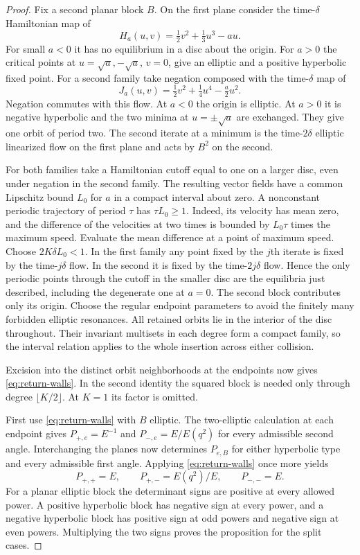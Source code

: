 \begin{proof}
Fix a second planar block $B$. On the first plane consider the
time-$\delta$ Hamiltonian map of
\[
 H_a(u,v)=\tfrac12v^2+\tfrac13u^3-au .
\]
For small $a<0$ it has no equilibrium in a disc about the origin.
For $a>0$ the critical points at $u=\sqrt a,-\sqrt a$, $v=0$,
give an elliptic and a positive hyperbolic fixed point. For a
second family take negation composed with the time-$\delta$ map of
\[
 J_a(u,v)=\tfrac12v^2+\tfrac14u^4-\tfrac a2u^2 .
\]
Negation commutes with this flow. At $a<0$ the origin is elliptic.
At $a>0$ it is negative hyperbolic and the two minima at
$u=\pm\sqrt a$ are exchanged. They give one orbit of period two.
The second iterate at a minimum is the time-$2\delta$ elliptic
linearized flow on the first plane and acts by $B^2$ on the second.

For both families take a Hamiltonian cutoff equal to one on a
larger disc, even under negation in the second family. The resulting
vector fields have a common Lipschitz bound $L_0$ for $a$ in a
compact interval about zero. A nonconstant periodic trajectory of
period $\tau$ has $\tau L_0\ge1$. Indeed, its velocity has mean
zero, and the difference of the velocities at two times is bounded
by $L_0\tau$ times the maximum speed. Evaluate the mean difference
at a point of maximum speed. Choose $2K\delta L_0<1$. In the first
family any point fixed by the $j$th iterate is fixed by the
time-$j\delta$ flow. In the second it is fixed by the time-$2j\delta$
flow. Hence the only periodic points through the cutoff in the
smaller disc are the equilibria just described, including the
degenerate one at $a=0$. The second block contributes only its
origin. Choose the regular endpoint parameters to avoid the finitely
many forbidden elliptic resonances. All retained orbits lie in the
interior of the disc throughout. Their invariant multisets in each
degree form a compact family, so the interval relation applies to
the whole insertion across either collision.

Excision into the distinct orbit neighborhoods at the endpoints now gives
\eqref{eq:return-walls}. In the second identity the squared block is
needed only through degree $\lfloor K/2\rfloor$. At $K=1$ its factor
is omitted.

First use \eqref{eq:return-walls} with $B$ elliptic. The
two-elliptic calculation at each endpoint gives $P_{+,e}=E^{-1}$
and $P_{-,e}=E/E(q^2)$ for every admissible second angle.
Interchanging the planes now determines $P_{e,B}$ for either
hyperbolic type and every admissible first angle. Applying
\eqref{eq:return-walls} once more yields
\[
 P_{+,+}=E,\qquad P_{+,-}=E(q^2)/E,\qquad P_{-,-}=E .
\]
For a planar elliptic block the determinant signs are positive
at every allowed power. A positive hyperbolic block has negative
sign at every power, and a negative hyperbolic block has positive
sign at odd powers and negative sign at even powers. Multiplying
the two signs proves the proposition for the split cases.


\end{proof}
